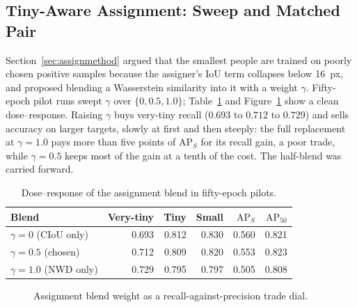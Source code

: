 \documentclass[12pt,a4paper,oneside]{report}
\begin{document}
\subsection{Tiny-Aware Assignment: Sweep and Matched Pair}
\label{sec:assignresults}
Section~\ref{sec:assignmethod} argued that the smallest people are trained on
poorly chosen positive samples because the assigner's IoU term collapses below
16~px, and proposed blending a Wasserstein similarity into it with a weight
$\gamma$. Fifty-epoch pilot runs swept $\gamma$ over $\{0, 0.5, 1.0\}$;
Table~\ref{tab:gamma} and Figure~\ref{fig:gammadose} show a clean
dose--response. Raising $\gamma$ buys very-tiny recall ($0.693$ to $0.712$ to
$0.729$) and sells accuracy on larger targets, slowly at first and then
steeply: the full replacement at $\gamma=1.0$ pays more than five points of
$\mathrm{AP}_S$ for its recall gain, a poor trade, while $\gamma=0.5$ keeps
most of the gain at a tenth of the cost. The half-blend was carried forward.

\begin{table}[tbp]
  \centering
  \caption{Dose--response of the assignment blend in fifty-epoch pilots.}
  \label{tab:gamma}
  \begin{tabular}{|l|r|r|r|r|r|}
    \hline
    Blend & Very-tiny & Tiny & Small & $\mathrm{AP}_S$ & $\mathrm{AP}_{50}$ \\
    \hline
    $\gamma=0$ (CIoU only)   & 0.693 & 0.812 & 0.830 & 0.560 & 0.821 \\ \hline
    $\gamma=0.5$ (chosen)    & 0.712 & 0.809 & 0.820 & 0.553 & 0.823 \\ \hline
    $\gamma=1.0$ (NWD only)  & 0.729 & 0.795 & 0.797 & 0.505 & 0.808 \\
    \hline
  \end{tabular}
\end{table}

\begin{figure}[tbp]
  \centering
  \caption{Assignment blend weight as a recall-against-precision trade dial.}
  \label{fig:gammadose}
\end{figure}
\end{document}
